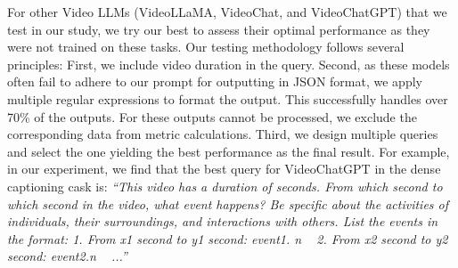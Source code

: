 \documentclass[10pt,twocolumn,letterpaper]{article}
\begin{document}
For other Video LLMs (VideoLLaMA, VideoChat, and VideoChatGPT) that we test in our study, we try our best to assess their optimal performance as they were not trained on these tasks. Our testing methodology follows several principles: First, we include video duration  in the query. Second, as these models often fail to adhere to our prompt for outputting in JSON format, we apply multiple regular expressions to format the output. This successfully handles over 70\% of the outputs. For these outputs cannot be processed, we exclude the corresponding data from metric calculations. Third, we design multiple queries and select the one yielding the best performance as the final result. For example, in our experiment, we find that the best query for VideoChatGPT in the dense captioning cask is: \textit{``This video has a duration of  seconds. From which second to which second in the video, what event happens? Be specific about the activities of individuals, their surroundings, and interactions with others. List the events in the format: 1. From x1 second to y1 second: event1. n ~ 2. From x2 second to y2 second: event2.n ~ ...''}
\end{document}
